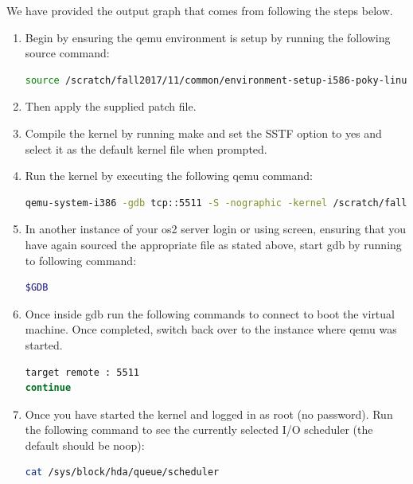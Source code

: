 \documentclass[letterpaper, onecolumn, draftclsnofoot, 10pt, compsoc]{IEEEtran}
\begin{document}
    \begin{singlespace}
    We have provided the output graph that comes from following the steps below.
    \begin{enumerate}
        \item Begin by ensuring the qemu environment is setup by running the following source command: 
            \begin{lstlisting}[language=bash]
source /scratch/fall2017/11/common/environment-setup-i586-poky-linux
            \end{lstlisting}
        \item Then apply the supplied patch file.
        \item Compile the kernel by running make and set the SSTF option to yes and select it as the default kernel file when prompted.
        \item Run the kernel by executing the following qemu command:
            \begin{lstlisting}[language=bash]
qemu-system-i386 -gdb tcp::5511 -S -nographic -kernel /scratch/fall2017/11/group11repo/linux/arch/x86/boot/bzImage -drive file=/scratch/fall2017/11/common/core-image-lsb-sdk-qemux86.ext4 -enable-kvm -net none -usb -localtime --no-reboot --append "root=/dev/hda rw console=ttyS0 debug" | tee output.txt
            \end{lstlisting}
        \item In another instance of your os2 server login or using screen, ensuring that you have again sourced the appropriate file as stated above, start gdb by running to following command:
            \begin{lstlisting}[language=bash]
$GDB
            \end{lstlisting}
        \item Once inside gdb run the following commands to connect to boot the virtual machine. Once completed, switch back over to the instance where qemu was started.
            \begin{lstlisting}[language=bash]
target remote : 5511
continue
            \end{lstlisting}
        \item Once you have started the kernel and logged in as root (no password). Run the following command to see the currently selected I/O scheduler (the default should be noop):
            \begin{lstlisting}[language=bash]
cat /sys/block/hda/queue/scheduler
            \end{lstlisting}

\end{enumerate}
\end{singlespace}
\end{document}
